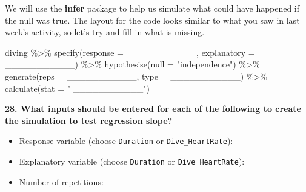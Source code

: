 \documentclass[
  letterpaper,
  DIV=11,
  numbers=noendperiod]{scrartcl}
\newenvironment{Shaded}{\begin{snugshade}}{\end{snugshade}}
\newcommand{\AttributeTok}[1]{\textcolor[rgb]{0.40,0.45,0.13}{#1}}
\newcommand{\FunctionTok}[1]{\textcolor[rgb]{0.28,0.35,0.67}{#1}}
\newcommand{\NormalTok}[1]{\textcolor[rgb]{0.00,0.23,0.31}{#1}}
\newcommand{\SpecialCharTok}[1]{\textcolor[rgb]{0.37,0.37,0.37}{#1}}
\newcommand{\StringTok}[1]{\textcolor[rgb]{0.13,0.47,0.30}{#1}}
\providecommand{\tightlist}{%
  \setlength{\itemsep}{0pt}\setlength{\parskip}{0pt}}\usepackage{longtable,booktabs,array}
\begin{document}
We will use the \textbf{infer} package to help us simulate what could
have happened if the null was true. The layout for the code looks
similar to what you saw in last week's activity, so let's try and fill
in what is missing.

\begin{Shaded}
\begin{Highlighting}[]
\NormalTok{diving }\SpecialCharTok{\%\textgreater{}\%} 
  \FunctionTok{specify}\NormalTok{(}\AttributeTok{response =}\NormalTok{ \_\_\_\_\_\_\_\_\_\_\_, }
          \AttributeTok{explanatory =}\NormalTok{  \_\_\_\_\_\_\_\_\_\_\_) }\SpecialCharTok{\%\textgreater{}\%} 
  \FunctionTok{hypothesise}\NormalTok{(}\AttributeTok{null =} \StringTok{"independence"}\NormalTok{) }\SpecialCharTok{\%\textgreater{}\%} 
  \FunctionTok{generate}\NormalTok{(}\AttributeTok{reps =}\NormalTok{  \_\_\_\_\_\_\_\_\_\_\_, }
           \AttributeTok{type =}\NormalTok{  \_\_\_\_\_\_\_\_\_\_\_) }\SpecialCharTok{\%\textgreater{}\%} 
  \FunctionTok{calculate}\NormalTok{(}\AttributeTok{stat =} \StringTok{" \_\_\_\_\_\_\_\_\_\_\_"}\NormalTok{)}
\end{Highlighting}
\end{Shaded}

\textbf{28. What inputs should be entered for each of the following to
create the simulation to test regression slope?}

\vspace{.5 mm}

\begin{itemize}
\tightlist
\item
  Response variable (choose \texttt{Duration} or
  \texttt{Dive\_HeartRate}): 
\end{itemize}

\vspace{0.2in}

\begin{itemize}
\tightlist
\item
  Explanatory variable (choose \texttt{Duration} or
  \texttt{Dive\_HeartRate}): 
\end{itemize}

\vspace{0.2in}

\begin{itemize}
\tightlist
\item
  Number of repetitions: 
\end{itemize}
\end{document}
